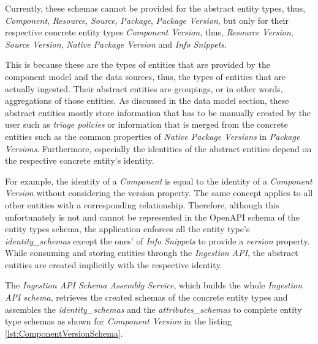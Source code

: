 Currently, these schemas cannot be provided for the abstract entity types, thus, \emph{Component}, \emph{Resource}, \emph{Source}, \emph{Package}, \emph{Package Version}, but only for their respective concrete entity types \emph{Component Version}, thus, \emph{Resource Version}, \emph{Source Version}, \emph{Native Package Version} and \emph{Info Snippets}.\par 
This is because these are the types of entities that are provided by the component model and the data sources, thus, the types of entities that are actually ingested. Their abstract entities are groupings, or in other words, aggregations of those entities. As discussed in the data model section, these abstract entities mostly store information that has to be manually created by the user such as \emph{triage policies} or information that is merged from the concrete entities such as the common properties of \emph{Native Package Versions} in \emph{Package Versions}. Furthermore, especially the identities of the abstract entities depend on the respective concrete entity's identity.\par
For example, the identity of a \emph{Component} is equal to the identity of a \emph{Component Version} without considering the version property. The same concept applies to all other entities with a corresponding relationship. Therefore, although this unfortunately is not and cannot be represented in the OpenAPI schema of the entity types schema, the application enforces all the entity type's \emph{identity\_schemas} except the ones' of \emph{Info Snippets} to provide a \emph{version} property. While consuming and storing entities through the \emph{Ingestion API}, the abstract entities are created implicitly with the respective identity.\par
The \emph{Ingestion API Schema Assembly Service}, which builds the whole \emph{Ingestion API schema}, retrieves the created schemas of the concrete  entity types and assembles the \emph{identity\_schemas} and the \emph{attributes\_schemas} to complete entity type schemas as shown for \emph{Component Version} in the listing \ref{lst:ComponentVersionSchema}.\\

